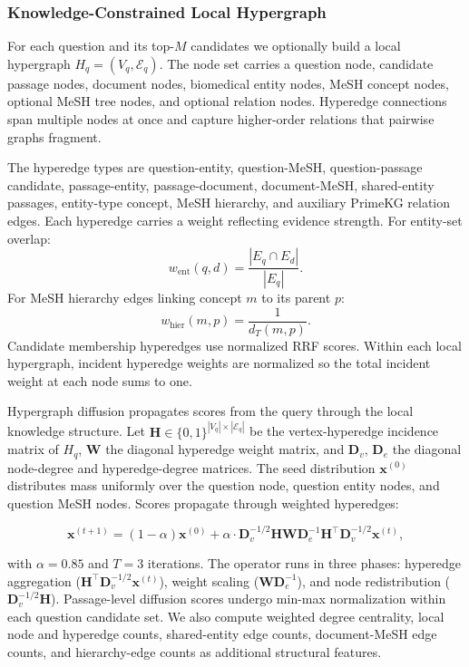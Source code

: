 \subsubsection{Knowledge-Constrained Local Hypergraph}

For each question and its top-$M$ candidates we optionally build a local hypergraph $H_q=(V_q,\mathcal{E}_q)$. The node set carries a question node, candidate passage nodes, document nodes, biomedical entity nodes, MeSH concept nodes, optional MeSH tree nodes, and optional relation nodes. Hyperedge connections span multiple nodes at once and capture higher-order relations that pairwise graphs fragment.

The hyperedge types are question-entity, question-MeSH, question-passage candidate, passage-entity, passage-document, document-MeSH, shared-entity passages, entity-type concept, MeSH hierarchy, and auxiliary PrimeKG relation edges. Each hyperedge carries a weight reflecting evidence strength. For entity-set overlap:
\[
  w_{\text{ent}}(q,d) = \frac{|E_q \cap E_d|}{|E_q|}.
\]
For MeSH hierarchy edges linking concept $m$ to its parent $p$:
\[
  w_{\text{hier}}(m,p) = \frac{1}{d_T(m,p)}.
\]
Candidate membership hyperedges use normalized RRF scores. Within each local hypergraph, incident hyperedge weights are normalized so the total incident weight at each node sums to one.

Hypergraph diffusion propagates scores from the query through the local knowledge structure. Let $\mathbf{H} \in \{0,1\}^{|V_q| \times |\mathcal{E}_q|}$ be the vertex-hyperedge incidence matrix of $H_q$, $\mathbf{W}$ the diagonal hyperedge weight matrix, and $\mathbf{D}_v$, $\mathbf{D}_e$ the diagonal node-degree and hyperedge-degree matrices. The seed distribution $\mathbf{x}^{(0)}$ distributes mass uniformly over the question node, question entity nodes, and question MeSH nodes. Scores propagate through weighted hyperedges:

\[
  \mathbf{x}^{(t+1)} = (1-\alpha)\mathbf{x}^{(0)} + \alpha \cdot \mathbf{D}_v^{-1/2} \mathbf{H} \mathbf{W} \mathbf{D}_e^{-1} \mathbf{H}^\top \mathbf{D}_v^{-1/2} \mathbf{x}^{(t)},
\]

with $\alpha=0.85$ and $T=3$ iterations. The operator runs in three phases: hyperedge aggregation ($\mathbf{H}^\top \mathbf{D}_v^{-1/2} \mathbf{x}^{(t)}$), weight scaling ($\mathbf{W} \mathbf{D}_e^{-1}$), and node redistribution ($\mathbf{D}_v^{-1/2} \mathbf{H}$). Passage-level diffusion scores undergo min-max normalization within each question candidate set. We also compute weighted degree centrality, local node and hyperedge counts, shared-entity edge counts, document-MeSH edge counts, and hierarchy-edge counts as additional structural features.

